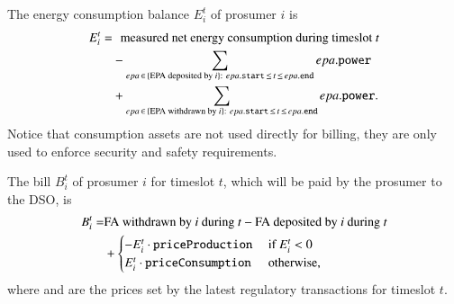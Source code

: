 The energy consumption balance $E_i^t$ of prosumer $i$ is
\begin{align*}
E_i^t = & \hphantom{+} \text{measured net energy consumption during timeslot } t \\ 
 & - \sum_{epa \,\in\, \{\text{EPA deposited by } i\}: ~ epa.\texttt{start} \,\leq\, t \,\leq\, epa.\texttt{end}} epa.\texttt{power} \\
 & + \sum_{epa \,\in\, \{\text{EPA withdrawn by } i\}: ~ epa.\texttt{start} \,\leq\, t \,\leq\, epa.\texttt{end}} epa.\texttt{power} .
\end{align*}
Notice that consumption assets are not used directly for billing, they are only used to enforce security and safety requirements.

The bill $B_i^t$ of prosumer $i$ for timeslot $t$, which will be paid
by the prosumer to the DSO, is
\begin{align*}
B_i^t = &  \text{FA withdrawn by $i$ during $t$} - \text{FA deposited by $i$ during $t$} \\
 & + \begin{cases}
- E_i^t \cdot \texttt{priceProduction} & \text{ if } E_i^t < 0 \\
 E_i^t \cdot \texttt{priceConsumption} & \text{ otherwise,} 
\end{cases}
\end{align*}
where {} and {} are the
prices set by the latest regulatory transactions for timeslot $t$. 


